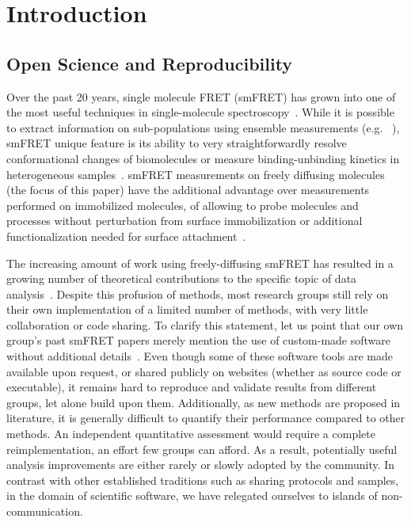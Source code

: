 \section{Introduction}

\subsection{Open Science and Reproducibility}

Over the past 20 years, single molecule FRET (smFRET) has grown into one of the most
useful techniques in single-molecule spectroscopy~\cite{Weiss_1999,Hohlbein_2014}.
While it is possible to extract information on sub-populations using ensemble measurements (e.g. ~\cite{Lerner_2014,Rahamim_2015}),
smFRET unique feature is its ability to very straightforwardly resolve conformational
changes of biomolecules or measure binding-unbinding kinetics in heterogeneous samples~\cite{Selvin_2000,Roy_2008}.
smFRET measurements on freely diffusing molecules (the focus of this paper) have the additional advantage over measurements performed on immobilized molecules, of allowing to probe molecules and processes without perturbation from surface
immobilization or additional functionalization needed for surface attachment~\cite{Eggeling_1998,Dahan_1999}.

The increasing amount of work using freely-diffusing smFRET has resulted 
in a growing number of theoretical contributions to the specific topic of data 
analysis~\cite{Fries_1998,Eggeling_2001,Zhang_2005,Gopich_2005,Lee_2005,Nir_2006,Antonik2006,Gopich_2007,Gopich_2008,Camley_2009,Santoso_2010,Torella_2011,Tomov_2012}. 
Despite this profusion of methods, most research groups still rely on 
their own implementation of a limited number of methods, with very little 
collaboration or code sharing. 
To clarify this statement, let us point that our own group's past smFRET papers 
merely mention the use of custom-made software without additional details~\cite{Lee_2005,Nir_2006}. 
Even though some of these software tools are made available upon request, 
or shared publicly on websites (whether as source code or executable), 
it remains hard to reproduce and validate results from different groups, 
let alone build upon them. 
Additionally, as new methods are proposed in literature,
it is generally difficult to quantify their performance compared to other methods.
An independent quantitative assessment
would require a complete reimplementation, an effort few groups can afford.
As a result, potentially useful analysis improvements
are either rarely or slowly adopted by the community.
In contrast with other established traditions such as
sharing protocols and samples, in the domain of scientific software,
we have relegated ourselves to islands of non-communication.

